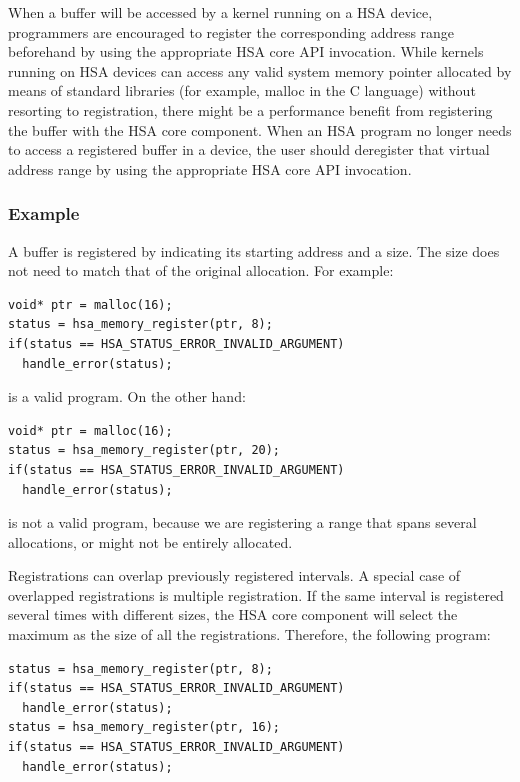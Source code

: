\documentclass[draft]{book}
\begin{document}
When a buffer will be accessed by a kernel running on a HSA device, programmers
are encouraged to register the corresponding address range beforehand by using
the appropriate HSA core API invocation. While kernels running on HSA devices
can access any valid system memory pointer allocated by means of standard
libraries (for example, malloc in the C language) without resorting to
registration, there might be a performance benefit from registering the buffer
with the HSA core component. When an HSA program no longer needs to access a
registered buffer in a device, the user should deregister that virtual address
range by using the appropriate HSA core API invocation.



\hypertarget{registration-usage}{}\subsubsection{Example}\label{registration-usage}

A buffer is registered by indicating its starting address and a size. The size
does not need to match that of the original allocation. For example:

\begin{lstlisting}
void* ptr = malloc(16);
status = hsa_memory_register(ptr, 8);
if(status == HSA_STATUS_ERROR_INVALID_ARGUMENT)
  handle_error(status);
\end{lstlisting}

 is a valid program. On the other hand:

\begin{lstlisting}
void* ptr = malloc(16);
status = hsa_memory_register(ptr, 20);
if(status == HSA_STATUS_ERROR_INVALID_ARGUMENT)
  handle_error(status);
\end{lstlisting}

is not a valid program, because we are registering a range that spans several
allocations, or might not be entirely allocated.

Registrations can overlap previously registered intervals. A special case of
overlapped registrations is multiple registration. If the same interval is
registered several times with different sizes, the HSA core component will
select the maximum as the size of all the registrations. Therefore, the
following program:

\begin{lstlisting}
status = hsa_memory_register(ptr, 8);
if(status == HSA_STATUS_ERROR_INVALID_ARGUMENT)
  handle_error(status);
status = hsa_memory_register(ptr, 16);
if(status == HSA_STATUS_ERROR_INVALID_ARGUMENT)
  handle_error(status);
\end{lstlisting}
\end{document}
